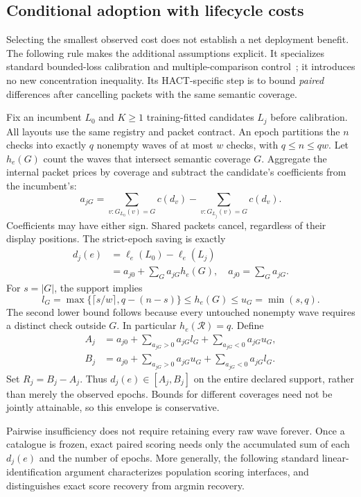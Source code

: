 \subsection{Conditional adoption with lifecycle costs}\label{sec:adoption}
Selecting the smallest observed cost does not establish a net deployment
benefit. The following rule makes the additional assumptions explicit.
It specializes standard bounded-loss calibration and multiple-comparison
control~\cite{hoeffding,learntest}; it introduces no new concentration inequality.
Its HACT-specific step is to bound \emph{paired} differences after cancelling
packets with the same semantic coverage.

Fix an incumbent $L_0$ and $K\ge1$ training-fitted candidates $L_j$ before
calibration. All layouts use the same registry and packet contract.
An epoch partitions the $n$ checks into exactly $q$ nonempty waves of at
most $w$ checks, with $q\le n\le qw$. Let $h_e(G)$ count the waves that
intersect semantic coverage $G$. Aggregate the internal packet prices by
coverage and subtract the candidate's coefficients from the incumbent's:
\[
 a_{jG}=\sum_{v:G_{L_0}(v)=G}c(d_v)
          -\sum_{v:G_{L_j}(v)=G}c(d_v).
\]
Coefficients may have either sign. Shared packets cancel, regardless of
their display positions. The strict-epoch saving is exactly
\begin{align}\label{eq:paired-saving}
 d_j(e)&=\ell_e(L_0)-\ell_e(L_j)\nonumber\\
       &=a_{j0}+\sum_G a_{jG}h_e(G),\quad
 a_{j0}=\sum_Ga_{jG}.
\end{align}
For $s=|G|$, the support implies
\begin{equation}\label{eq:hit-envelope}
 l_G=\max\{\lceil s/w\rceil,q-(n-s)\}
       \le h_e(G)\le u_G=\min(s,q).
\end{equation}
The second lower bound follows because every untouched nonempty wave
requires a distinct check outside $G$. In particular $h_e(\mathcal R)=q$.
Define
\begin{align*}
 A_j&=a_{j0}+\sum_{a_{jG}>0}a_{jG}l_G
                    +\sum_{a_{jG}<0}a_{jG}u_G,\\
 B_j&=a_{j0}+\sum_{a_{jG}>0}a_{jG}u_G
                    +\sum_{a_{jG}<0}a_{jG}l_G.
\end{align*}
Set $R_j=B_j-A_j$. Thus $d_j(e)\in[A_j,B_j]$ on the entire declared support, rather than
merely the observed epochs. Bounds for different coverages need not be
jointly attainable, so this envelope is conservative.

Pairwise insufficiency does not require retaining every raw wave forever.
Once a catalogue is frozen, exact paired scoring needs only the accumulated
sum of each $d_j(e)$ and the number of epochs. More generally, the following
standard linear-identification argument characterizes population scoring
interfaces, and distinguishes exact score recovery from argmin recovery.

